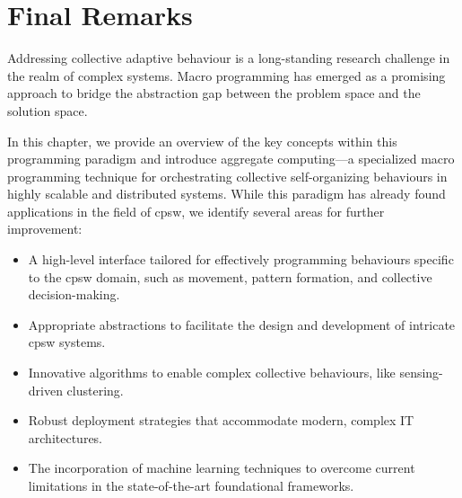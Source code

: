 \section{Final Remarks}
Addressing collective adaptive behaviour is a long-standing research challenge in the realm of complex systems. 
 Macro programming has emerged as a promising approach to bridge the abstraction gap between the problem space and the solution space. 

In this chapter, 
 we provide an overview of the key concepts within this programming paradigm and introduce aggregate computing---a specialized macro programming technique for orchestrating collective self-organizing behaviours in highly scalable and distributed systems. 
 While this paradigm has already found applications in the field of \ac{cpsw}, 
 we identify several areas for further improvement:
\begin{itemize}
    \item A high-level interface tailored for effectively programming behaviours specific to the \ac{cpsw} domain, such as movement, pattern formation, and collective decision-making.
    \item Appropriate abstractions to facilitate the design and development of intricate \ac{cpsw} systems.
    \item Innovative algorithms to enable complex collective behaviours, like sensing-driven clustering.
    \item Robust deployment strategies that accommodate modern, complex IT architectures.
    \item The incorporation of machine learning techniques to overcome current limitations in the state-of-the-art foundational frameworks.
\end{itemize}

